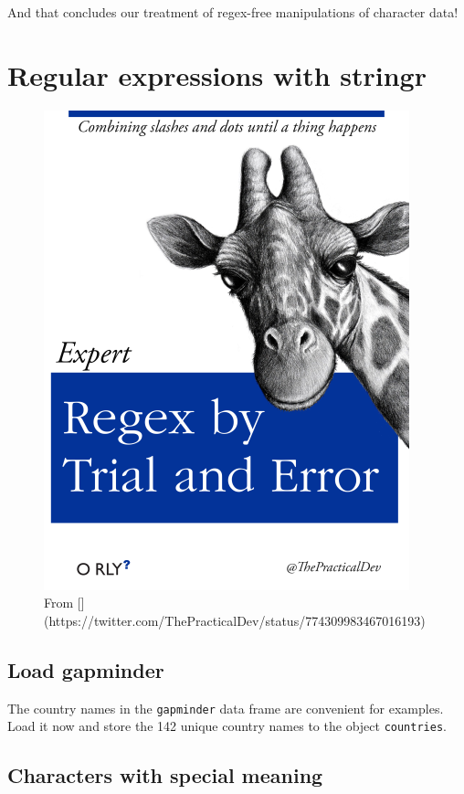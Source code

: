 \documentclass[
]{book}
\newenvironment{Shaded}{\begin{snugshade}}{\end{snugshade}}
\newcommand{\KeywordTok}[1]{\textcolor[rgb]{0.13,0.29,0.53}{\textbf{#1}}}
\newcommand{\NormalTok}[1]{#1}
\newcommand{\OperatorTok}[1]{\textcolor[rgb]{0.81,0.36,0.00}{\textbf{#1}}}
\newcommand{\StringTok}[1]{\textcolor[rgb]{0.31,0.60,0.02}{#1}}
\begin{document}
And that concludes our treatment of regex-free manipulations of character data!

\hypertarget{regular-expressions-with-stringr}{%
\section{Regular expressions with stringr}\label{regular-expressions-with-stringr}}

\begin{figure}
\includegraphics[width=0.5\linewidth]{img/regexbytrialanderror-big-smaller} \caption{From [\@ThePracticalDev](https://twitter.com/ThePracticalDev/status/774309983467016193)}\label{fig:unnamed-chunk-18}
\end{figure}

\hypertarget{load-gapminder}{%
\subsection{Load gapminder}\label{load-gapminder}}

The country names in the \texttt{gapminder} data frame are convenient for examples. Load it now and store the 142 unique country names to the object \texttt{countries}.

\begin{Shaded}
\end{Shaded}

\hypertarget{characters-with-special-meaning}{%
\subsection{Characters with special meaning}\label{characters-with-special-meaning}}
\end{document}
